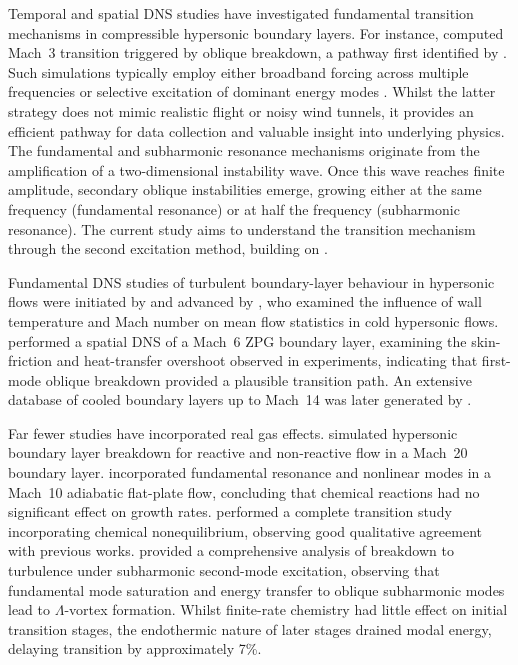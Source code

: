 Temporal and spatial \gls{DNS} studies have investigated fundamental transition mechanisms in compressible hypersonic boundary layers. For instance, \citet{Mayer2011} computed Mach~3 transition triggered by oblique breakdown, a pathway first identified by \citet{Fasel1993}. Such simulations typically employ either broadband forcing across multiple frequencies or selective excitation of dominant energy modes \citep{AlamSandham2000,Bhaskaran2011}. Whilst the latter strategy does not mimic realistic flight or noisy wind tunnels, it provides an efficient pathway for data collection and valuable insight into underlying physics. The fundamental and subharmonic resonance mechanisms originate from the amplification of a two-dimensional instability wave. Once this wave reaches finite amplitude, secondary oblique instabilities emerge, growing either at the same frequency (fundamental resonance) or at half the frequency (subharmonic resonance). The current study aims to understand the transition mechanism through the second excitation method, building on .

Fundamental \gls{DNS} studies of turbulent boundary-layer behaviour in hypersonic flows were initiated by \citet{Martin2007} and advanced by \citet{Duan2011}, who examined the influence of wall temperature and Mach number on mean flow statistics in cold hypersonic flows. \citet{Franko2013} performed a spatial \gls{DNS} of a Mach~6 \gls{ZPG} boundary layer, examining the skin-friction and heat-transfer overshoot observed in experiments, indicating that first-mode oblique breakdown provided a plausible transition path. An extensive database of cooled boundary layers up to Mach~14 was later generated by \citet{Zhangetal2018}.

Far fewer studies have incorporated real gas effects. \citet{Stemmer2005} simulated hypersonic boundary layer breakdown for reactive and non-reactive flow in a Mach~20 boundary layer. \citet{Marxenetal2013,Marxenetal2014} incorporated fundamental resonance and nonlinear modes in a Mach~10 adiabatic flat-plate flow, concluding that chemical reactions had no significant effect on growth rates. \citet{DiRenzo2021} performed a complete transition study incorporating chemical nonequilibrium, observing good qualitative agreement with previous works. \citet{Passiatoreetal2021} provided a comprehensive analysis of breakdown to turbulence under subharmonic second-mode excitation, observing that fundamental mode saturation and energy transfer to oblique subharmonic modes lead to $\Lambda$-vortex formation. Whilst finite-rate chemistry had little effect on initial transition stages, the endothermic nature of later stages drained modal energy, delaying transition by approximately 7\%.


